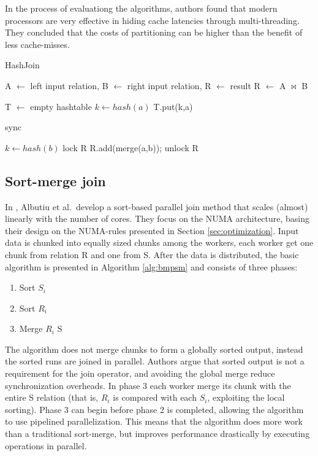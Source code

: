 In the process of evaluationg the algorithms, authors found that
modern processors are very effective in hiding cache latencies through
multi-threading. They concluded that the costs of partitioning can be
higher than the benefit of less cache-misses.

\begin{algorithm}[H]
	\caption{HashJoin}
	\label{alg:hashjoin}
	\begin{algorithmic}
		\REQUIRE A $\leftarrow$ left input relation, B $\leftarrow$
		right input relation, R $\leftarrow$ result
		\ENSURE R $\leftarrow$ A $\bowtie$ B

		\STATE T $\leftarrow$ empty hashtable
			\STATE $k \leftarrow hash(a)$
			\STATE T.put(k,a)
		\ENDFOR

		\STATE sync

			\STATE $k \leftarrow hash(b)$
						\STATE lock R
						\STATE R.add(merge(a,b));
						\STATE unlock R
					\ENDIF
				\ENDFOR
			\ENDIF
		\ENDFOR

	\end{algorithmic}
\end{algorithm}

\subsection{Sort-merge join}
\label{sortmergejoin}

In \cite{sortmergejoin}, Albutiu et al.\ develop a sort-based parallel
join method that scales (almost) linearly with the number of cores.
They focus on the NUMA architecture, basing their design on the
NUMA-rules presented in Section \ref{sec:optimization}. Input data is
chunked into equally sized chunks among the workers, each worker get
one chunk from relation R and one from S. After the data is
distributed, the basic algorithm is presented in Algorithm
\ref{alg:bmpsm} and consists of three phases:

\begin{enumerate}
	\item Sort $S_i$
	\item Sort $R_i$
	\item Merge $R_i$ S
\end{enumerate}

The algorithm does not merge chunks to form a globally sorted output,
instead the sorted runs are joined in parallel. Authors argue that
sorted output is not a requirement for the join operator, and avoiding
the global merge reduce synchronization overheads. In phase 3 each
worker merge its chunk with the entire S relation (that is, $R_i$ is
compared with each $S_i$, exploiting the local sorting). Phase 3 can
begin before phase 2 is completed, allowing the algorithm to use
pipelined parallelization. This means that the algorithm does more
work than a traditional sort-merge, but improves performance
drastically by executing operations in parallel.

